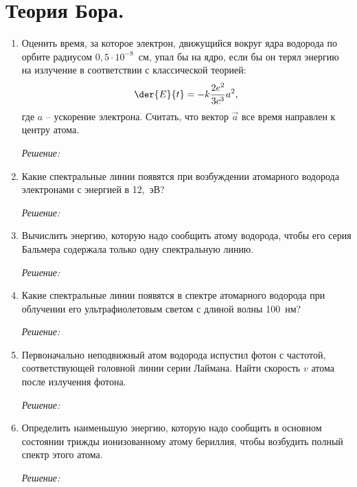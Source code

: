 \section{Теория Бора.}

\begin{enumerate}
\item Оценить время, за которое электрон, движущийся вокруг ядра водорода по
орбите радиусом \( 0,\!5 \cdot 10^{-8} \)~см, упал бы на ядро, если бы он терял
энергию на излучение в соответствии с классической теорией:
\[
    \der{E}{t} = -k\frac{2e^2}{3c^3}a^2,
\]
где \( a \) -- ускорение электрона. Считать, что вектор \( \vec{a} \) все время
направлен к центру атома.

\emph{Решение:}

\newpage

\item Какие спектральные линии появятся при возбуждении атомарного водорода
электронами с энергией в 12,~эВ?

\emph{Решение:}

\newpage

\item Вычислить энергию, которую надо сообщить атому водорода, чтобы его серия
Бальмера содержала только одну спектральную линию.

\emph{Решение:}

\newpage

\item Какие спектральные линии появятся в спектре атомарного водорода при
облучении его ультрафиолетовым светом с длиной волны 100~нм?

\emph{Решение:}

\newpage

\item Первоначально неподвижный атом водорода испустил фотон с частотой,
соответствующей головной линии серии Лаймана. Найти скорость \( v \) атома после
излучения фотона.

\emph{Решение:}

\newpage

\item Определить наименьшую энергию, которую надо сообщить в основном состоянии
трижды ионизованному атому бериллия, чтобы возбудить полный спектр этого атома.

\emph{Решение:}

\newpage


\end{enumerate}
